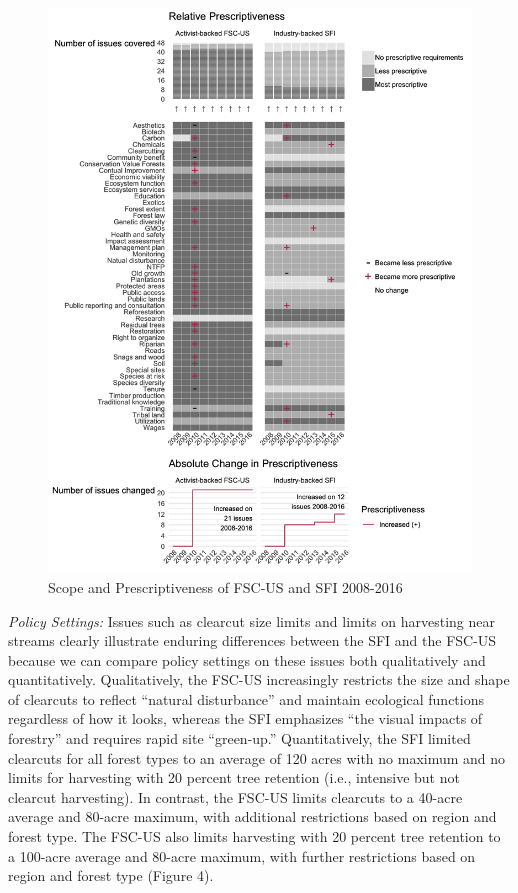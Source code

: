 \documentclass[
      12pt,
            Review ]{article}
\begin{document}
\begin{figure}
\centering
\includegraphics{FSC-SFI-1.png}
\caption{Scope and Prescriptiveness of FSC-US and SFI 2008-2016}
\end{figure}

\emph{Policy Settings:} Issues such as clearcut size limits and limits
on harvesting near streams clearly illustrate enduring differences
between the SFI and the FSC-US because we can compare policy settings on
these issues both qualitatively and quantitatively. Qualitatively, the
FSC-US increasingly restricts the size and shape of clearcuts to reflect
``natural disturbance'' and maintain ecological functions regardless of
how it looks, whereas the SFI emphasizes ``the visual impacts of
forestry'' and requires rapid site ``green-up.'' Quantitatively, the SFI
limited clearcuts for all forest types to an average of 120 acres with
no maximum and no limits for harvesting with 20 percent tree retention
(i.e., intensive but not clearcut harvesting). In contrast, the FSC-US
limits clearcuts to a 40-acre average and 80-acre maximum, with
additional restrictions based on region and forest type. The FSC-US also
limits harvesting with 20 percent tree retention to a 100-acre average
and 80-acre maximum, with further restrictions based on region and
forest type (Figure 4).
\end{document}
